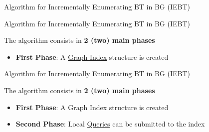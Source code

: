 \begin{frame}[fragile]{Algorithm for Incrementally Enumerating BT in BG (IEBT)}
  \begin{figure}
    \centering
  \end{figure}


  \begin{figure}
    \centering
  \end{figure}
\end{frame}

\begin{frame}[fragile]{Algorithm for Incrementally Enumerating BT in BG (IEBT)}
  \begin{center}
  \large The algorithm consists in \textbf{2 (two) main phases} 
  \end{center}  
  \vspace{2em}   
  \begin{itemize}
    \setlength\itemsep{2em}
    \item \textbf{First Phase}: A \underline{\color{red}Graph Index} structure is created
  \end{itemize}
\end{frame}

\begin{frame}[fragile]{Algorithm for Incrementally Enumerating BT in BG (IEBT)}
  \begin{center}
  \large The algorithm consists in \textbf{2 (two) main phases} 
  \end{center}     
  \vspace{2em}   
  \begin{itemize}
    \setlength\itemsep{2em}
    \item {\color{light}\textbf{First Phase}: A Graph Index structure is created}
    \item \textbf{Second Phase}: Local \underline{\color{red}Queries} can be submitted to the index
  \end{itemize}
\end{frame}

